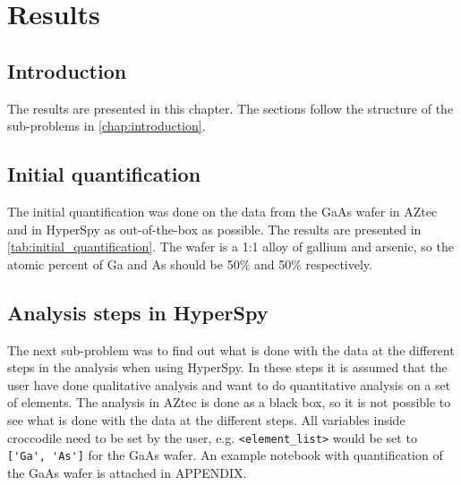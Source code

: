 \chapter{Results}

\section{Introduction}
\label{sec:results:intro}
The results are presented in this chapter.
The sections follow the structure of the sub-problems in \cref{chap:introduction}.

%
%
\section{Initial quantification}
\label{sec:results:initial_quantification}

The initial quantification was done on the data from the GaAs wafer in AZtec and in HyperSpy as out-of-the-box as possible.
The results are presented in \cref{tab:initial_quantification}.
The wafer is a 1:1 alloy of gallium and arsenic, so the atomic percent of Ga and As should be 50\% and 50\% respectively.



%
%
\section{Analysis steps in HyperSpy}
\label{sec:results:steps}


The next sub-problem was to find out what is done with the data at the different steps in the analysis when using HyperSpy.
In these steps it is assumed that the user have done qualitative analysis and want to do quantitative analysis on a set of elements.
The analysis in AZtec is done as a black box, so it is not possible to see what is done with the data at the different steps.
All variables inside croccodile need to be set by the user, e.g. \verb|<element_list>| would be set to \verb|['Ga', 'As']| for the GaAs wafer.
An example notebook with quantification of the GaAs wafer is attached in APPENDIX.

